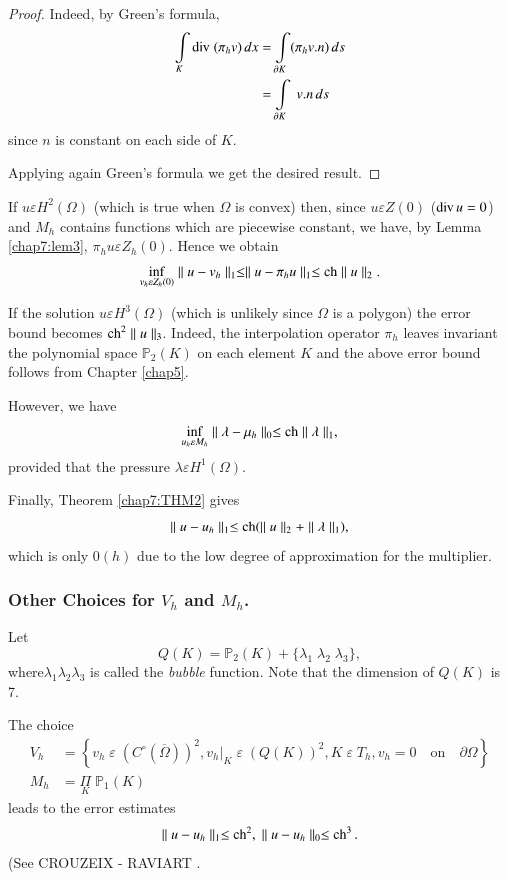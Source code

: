 \begin{proof}
Indeed, by Green's formula,
\begin{align*}
\int\limits_K\operatorname{div}\;(\pi_hv)\,dx &= \int\limits_{\partial K} (\pi_hv.n)
\,ds\\
&= \int\limits_{\partial K}\;v.n\,ds
\end{align*}
since $n$ is constant on each side of $K$. 

Applying again Green's formula we get the desired result.
\end{proof}

\medskip
{}\pageoriginale 
If $u\varepsilon H^2(\Omega)$ (which is 
true when $\Omega$ is convex) then, since $u\varepsilon Z(0)$ (\ie $\operatorname{div} u=0$)
and $M_h$ contains functions which are piecewise constant, we have, by
Lemma \ref{chap7:lem3}, $\pi_hu\varepsilon Z_h(0)$. Hence we obtain
$$
\inf\limits_{v_h\varepsilon Z_h(0)}\parallel u-v_h\parallel_1\leq
\parallel u-\pi_hu\parallel_1\leq\operatorname{ch}\parallel u\parallel_2.
$$

If the solution $u\varepsilon H^3(\Omega)$ (which is unlikely since
$\Omega$ is a polygon) the error bound becomes $\operatorname{ch}^2\parallel
u\parallel_3$. Indeed, the interpolation operator $\pi_h$ leaves
invariant the polynomial space $\mathbb{P}_2(K)$ on each element $K$
and the above error bound follows from Chapter \ref{chap5}.

However, we have 
$$
\inf\limits_{u_h\varepsilon M_h}\parallel\lambda-\mu_h\parallel_0\leq
\operatorname{ch}\parallel\lambda\parallel_1,
$$
provided that the pressure $\lambda\varepsilon H^1(\Omega)$.

Finally, Theorem \ref{chap7:THM2} gives
$$
\parallel u-u_h\parallel_1\leq\operatorname{ch}(\parallel u\parallel_2+ \parallel
\lambda\parallel_1),
$$
which is only $0(h)$ due to the low degree of approximation for the
multiplier.

\subsubsection{\bf Other Choices for $V_h$ and $M_h$.} 

\hspace{2cm} Let 
$$
Q(K)=\mathbb{P}_2(K)+\{\lambda_1\;\lambda_2\;\lambda_3\},
$$
where\pageoriginale $\lambda_1\lambda_2\lambda_3$ is called the 
\emph{bubble} function. Note that the dimension of $Q(K)$ is 7.

The choice 
\begin{align*}
V_h &= \left\{v_h\;\varepsilon \;(C^\circ(\overline{\Omega}))^2,v_h|_K\;
\varepsilon \;(Q(K))^2,K\;\varepsilon \;T_h,v_h=0\quad\text{on}\quad
\partial\Omega\right\}\\ 
M_h &= \underset{K}{\Pi}\;\mathbb{P}_1(K)
\end{align*}
leads to the error estimates
$$
\parallel u-u_h\parallel_1\leq\operatorname{ch}^2,\; \parallel u-u_h
\parallel_0\leq\operatorname{ch}^3.
$$
(See CROUZEIX - RAVIART \cite{key14}.

